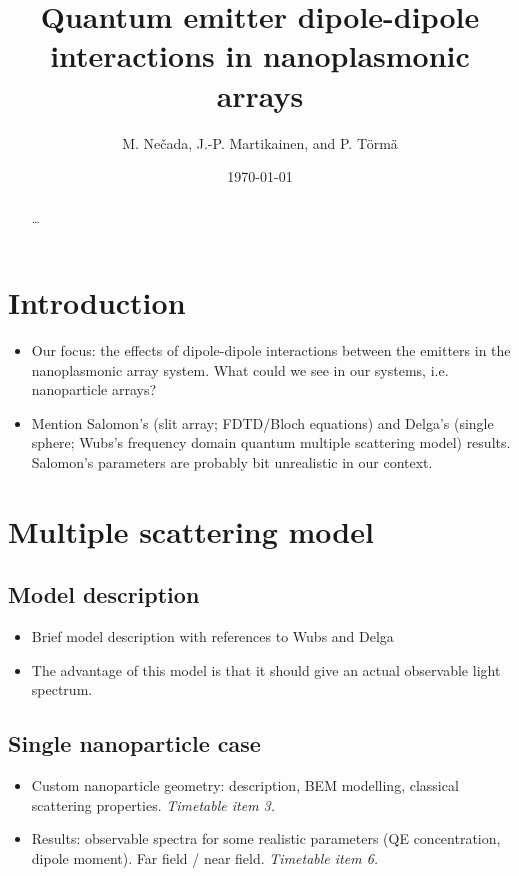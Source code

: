 \documentclass[pra,superscriptaddress,twocolumn,notitlepage,showpacs]{revtex4-1}
\begin{document}
\title{Quantum emitter dipole-dipole interactions in nanoplasmonic arrays}
\author{M. Ne\v{c}ada, J.-P. Martikainen, and P. T\"{o}rm\"{a}}
\date{\today}
\pacs{\dots}
\begin{abstract}
    \dots
\end{abstract}
\maketitle 


\section*{Introduction}
\begin{itemize}
\item Our focus: the effects of dipole-dipole interactions between the emitters
in the nanoplasmonic array system. What could we see in our systems,
i.e. nanoparticle arrays?
\item Mention Salomon's (slit array; FDTD/Bloch equations) and Delga's (single
sphere; Wubs's frequency domain quantum multiple scattering model)
results. Salomon's parameters are probably bit unrealistic in our
context.
\end{itemize}

\section*{Multiple scattering model}


\subsection*{Model description}
\begin{itemize}
\item Brief model description with references to Wubs and Delga
\item The advantage of this model is that it should give an actual observable
light spectrum.
\end{itemize}

\subsection*{Single nanoparticle case}
\begin{itemize}
\item Custom nanoparticle geometry: description, BEM modelling, classical
scattering properties.\emph{ Timetable item 3. }
\item Results: observable spectra for some realistic parameters (QE concentration,
dipole moment). Far field / near field. \emph{Timetable item 6.}
\end{itemize}
\end{document}
